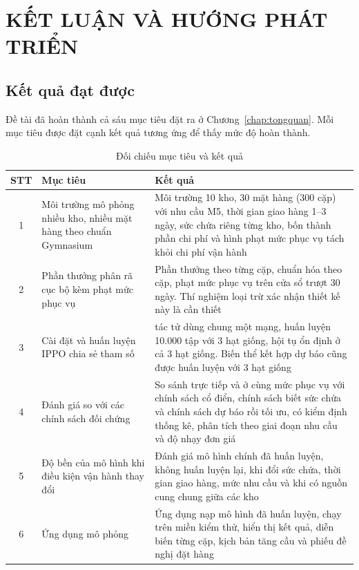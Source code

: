 \chapter{KẾT LUẬN VÀ HƯỚNG PHÁT TRIỂN}
\label{chap:chapter5}

\section{Kết quả đạt được}
\label{sec:tongKet}

Đề tài đã hoàn thành cả sáu mục tiêu đặt ra ở Chương~\ref{chap:tongquan}. Mỗi mục tiêu được đặt cạnh kết quả tương ứng để thấy mức độ hoàn thành.

\begin{table}[H]
    \centering
    \caption{Đối chiếu mục tiêu và kết quả}
    \label{tab:doiChieuMucTieu}
    \small
    \begin{tabular}{|c|>{\raggedright\arraybackslash}p{5.0cm}|>{\raggedright\arraybackslash}p{8.2cm}|}
        \hline
        STT & Mục tiêu & Kết quả \\
        \hline
        1 & Môi trường mô phỏng nhiều kho, nhiều mặt hàng theo chuẩn Gymnasium & Môi trường 10 kho, 30 mặt hàng (300 cặp) với nhu cầu M5, thời gian giao hàng 1--3 ngày, sức chứa riêng từng kho, bốn thành phần chi phí và hình phạt mức phục vụ tách khỏi chi phí vận hành \\ \hline
        2 & Phần thưởng phân rã cục bộ kèm phạt mức phục vụ & Phần thưởng theo từng cặp, chuẩn hóa theo cặp, phạt mức phục vụ trên cửa sổ trượt 30 ngày. Thí nghiệm loại trừ xác nhận thiết kế này là cần thiết \\ \hline
        3 & Cài đặt và huấn luyện IPPO chia sẻ tham số & 300 tác tử dùng chung một mạng, huấn luyện 10.000 tập với 3 hạt giống, hội tụ ổn định ở cả 3 hạt giống. Biến thể kết hợp dự báo cũng được huấn luyện với 3 hạt giống \\ \hline
        4 & Đánh giá so với các chính sách đối chứng & So sánh trực tiếp và ở cùng mức phục vụ với chính sách cổ điển, chính sách biết sức chứa và chính sách dự báo rồi tối ưu, có kiểm định thống kê, phân tích theo giai đoạn nhu cầu và độ nhạy đơn giá \\ \hline
        5 & Độ bền của mô hình khi điều kiện vận hành thay đổi & Đánh giá mô hình chính đã huấn luyện, không huấn luyện lại, khi đổi sức chứa, thời gian giao hàng, mức nhu cầu và khi có nguồn cung chung giữa các kho \\ \hline
        6 & Ứng dụng mô phỏng & Ứng dụng nạp mô hình đã huấn luyện, chạy trên miền kiểm thử, hiển thị kết quả, diễn biến từng cặp, kịch bản tăng cầu và phiếu đề nghị đặt hàng \\
        \hline
    \end{tabular}
\end{table}

